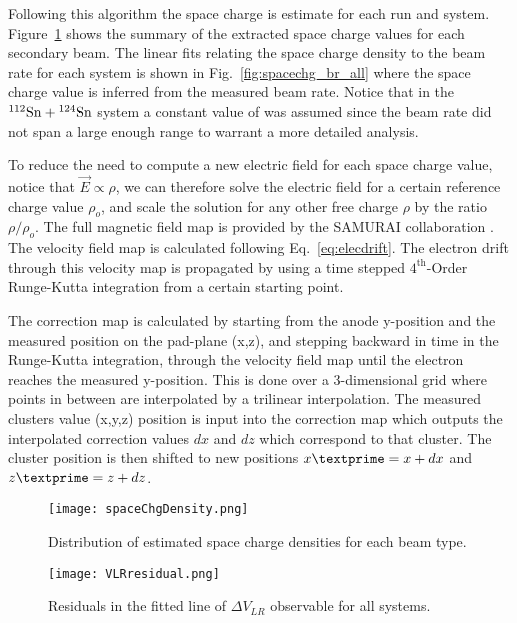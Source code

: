 Following this algorithm the space charge is estimate for each run and system. Figure~\ref{fig:scDensity} shows the summary of the extracted space charge values for each secondary beam. The linear fits relating the space charge density to the beam rate for each system is shown in Fig.~\ref{fig:spacechg_br_all} where the space charge value is inferred from the measured beam rate. Notice that in the ${}^{112}\mathrm{Sn} + {}^{124}\mathrm{Sn}$ system a constant value of was assumed since the beam rate did not span a large enough range to warrant a more detailed analysis. 

To reduce the need to compute a new electric field for each space charge value, notice that $\vec{E}\propto \rho$, we can therefore solve the electric field for a certain reference charge value $\rho_o$, and scale the solution for any other free charge $\rho$ by the ratio $\rho/\rho_o$. The full magnetic field map is provided by the SAMURAI collaboration \cite{magnet}. The velocity field map is calculated following Eq.~\ref{eq:elecdrift}. The electron drift through this velocity map is propagated by using a time stepped $\mathrm{4}^{\mathrm{th}}$-Order Runge-Kutta integration from a certain starting point.
  
 The correction map is calculated by starting from the anode y-position and the measured position on the pad-plane (x,z), and stepping backward in time in the Runge-Kutta integration, through the velocity field map until the electron reaches the measured y-position. This is done over a 3-dimensional grid where points in between are interpolated by a trilinear interpolation. The measured clusters value (x,y,z) position is input into the correction map which outputs the interpolated correction values $dx$ and $dz$ which correspond to that cluster. The cluster position is then shifted to new positions $x\textprime = x + dx$ and $z\textprime = z + dz$.
 


\begin{figure}[!htb]
\texttt{[image: spaceChgDensity.png]}
\caption{Distribution of estimated space charge densities for each beam type.}
\label{fig:scDensity}
\end{figure}



\begin{figure}[!htb]
\texttt{[image: VLRresidual.png]}
\caption{Residuals in the fitted line of $\Delta V_{LR}$ observable for all systems.}
\label{fig:vlrResidual}
\end{figure}

